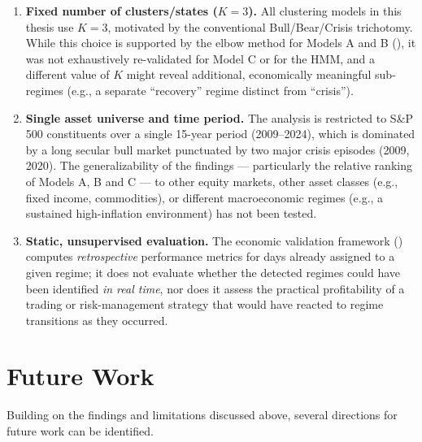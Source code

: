 \begin{enumerate}
  \item \textbf{Fixed number of clusters/states ($K=3$).} All clustering
  models in this thesis use $K=3$, motivated by the conventional
  Bull/Bear/Crisis trichotomy. While this choice is supported by the elbow
  method for Models A and B (), it
  was not exhaustively re-validated for Model C or for the HMM, and a
  different value of $K$ might reveal additional, economically meaningful
  sub-regimes (e.g., a separate ``recovery'' regime distinct from
  ``crisis'').

  \item \textbf{Single asset universe and time period.} The analysis is
  restricted to S\&P 500 constituents over a single 15-year period
  (2009--2024), which is dominated by a long secular bull market punctuated
  by two major crisis episodes (2009, 2020). The generalizability of the
  findings --- particularly the relative ranking of Models A, B and C ---
  to other equity markets, other asset classes (e.g., fixed income,
  commodities), or different macroeconomic regimes (e.g., a sustained
  high-inflation environment) has not been tested.

  \item \textbf{Static, unsupervised evaluation.} The economic validation
  framework () computes \emph{retrospective}
  performance metrics for days already assigned to a given regime; it does
  not evaluate whether the detected regimes could have been identified
  \emph{in real time}, nor does it assess the practical profitability of a
  trading or risk-management strategy that would have reacted to regime
  transitions as they occurred.
\end{enumerate}

\section{Future Work}
\label{sec:concl-future}

Building on the findings and limitations discussed above, several
directions for future work can be identified.

